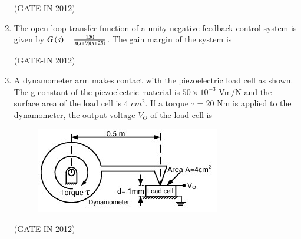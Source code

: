 \documentclass[journal,12pt,onecolumn]{IEEEtran}
\theoremstyle{remark}
\begin{document}
\begin{enumerate}
\hfill{(GATE-IN 2012)}
\begin{enumerate}
\end{enumerate}

\item The open loop transfer function of a unity negative feedback control system is given by $G\left(s\right) = \frac{150}{s\left(s+9\right)\left(s+25\right)}$. The gain margin of the system is

\hfill{(GATE-IN 2012)}
\begin{enumerate}
\end{enumerate}

\item A dynamometer arm makes contact with the piezoelectric load cell as shown. The g-constant of the piezoelectric material is $50 \times 10^{-3}$ Vm/N and the surface area of the load cell is $4$ $cm^2$. If a torque $\tau = 20$ Nm is applied to the dynamometer, the output voltage $V_O$ of the load cell is
\begin{figure}[H]
    \centering
    \includegraphics[width=0.8\columnwidth]{figs/a21.jpg}
    \caption*{}
    \label{fig:a21}
\end{figure}

\hfill{(GATE-IN 2012)}
\begin{enumerate}
\end{enumerate}


\end{enumerate}
\end{document}
